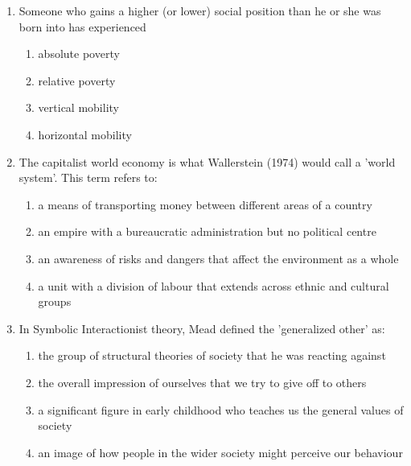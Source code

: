 \documentclass[12pt]{article}
\begin{document}
\begin{enumerate}[label=\arabic*.]
\begin{enumerate}[label=(\alph*)]
    \item elitists {\csname fa0057Font0\endcsname\char"0073}{\csname fa0057Font1\endcsname\char"0068}{\csname fa0057Font2\endcsname\char"006F}{\csname fa0057Font3\endcsname\char"0077}{\csname fa0057Font4\endcsname\char"0020}{\char"0073} {\csname fa0058Font0\endcsname\char"0075}{\csname fa0058Font1\endcsname\char"0070}{\csname fa0058Font2\endcsname\char"0070}{\csname fa0058Font3\endcsname\char"006F}{\char"0072}{\csname fa0058Font5\endcsname\char"0074} with the Americanization of culture
\end{enumerate}
\item Someone who gains a higher (or lower) social position than he or she was born into has experienced
\begin{enumerate}[label=(\alph*)]
    \item absolute poverty
    \item relative poverty
    \item vertical mobility
    \item horizontal mobility
\end{enumerate}
\item The capitalist world economy is what Wallerstein (1974) would call a 'world system'. This term refers to:
\begin{enumerate}[label=(\alph*)]
    \item a means of transporting money between different areas of a country
    \item an empire with a bureaucratic administration but no political centre
    \item an awareness of risks and dangers that affect the environment as a whole
    \item a unit with a division of labour that extends across ethnic and cultural groups
\end{enumerate}
\item In Symbolic Interactionist theory, Mead defined the 'generalized other' as:
\begin{enumerate}[label=(\alph*)]
    \item the group of structural theories of society that he was reacting against
    \item the overall impression of ourselves that we try to give off to others
    \item a significant figure in early childhood who teaches us the general values of society
    \item an image of how people in the wider society might perceive our behaviour

\end{enumerate}
\end{enumerate}
\end{document}
